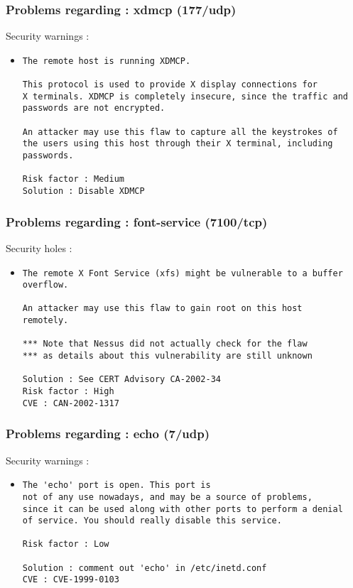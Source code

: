 \documentclass{article}
\begin{document}
\subsubsection{Problems regarding : xdmcp (177/udp)}
Security warnings :\\
\begin{itemize}
\item \begin{verbatim}
The remote host is running XDMCP.

This protocol is used to provide X display connections for 
X terminals. XDMCP is completely insecure, since the traffic and
passwords are not encrypted. 

An attacker may use this flaw to capture all the keystrokes of
the users using this host through their X terminal, including
passwords.

Risk factor : Medium
Solution : Disable XDMCP
\end{verbatim}\end{itemize}
\subsubsection{Problems regarding : font-service (7100/tcp)}
Security holes :\\
\begin{itemize}
\item \begin{verbatim}
The remote X Font Service (xfs) might be vulnerable to a buffer
overflow.

An attacker may use this flaw to gain root on this host
remotely.

*** Note that Nessus did not actually check for the flaw
*** as details about this vulnerability are still unknown

Solution : See CERT Advisory CA-2002-34
Risk factor : High
CVE : CAN-2002-1317
\end{verbatim}\end{itemize}
\subsubsection{Problems regarding : echo (7/udp)}
Security warnings :\\
\begin{itemize}
\item \begin{verbatim}
The 'echo' port is open. This port is
not of any use nowadays, and may be a source of problems, 
since it can be used along with other ports to perform a denial
of service. You should really disable this service.

Risk factor : Low

Solution : comment out 'echo' in /etc/inetd.conf
CVE : CVE-1999-0103
\end{verbatim}\end{itemize}
\end{document}
